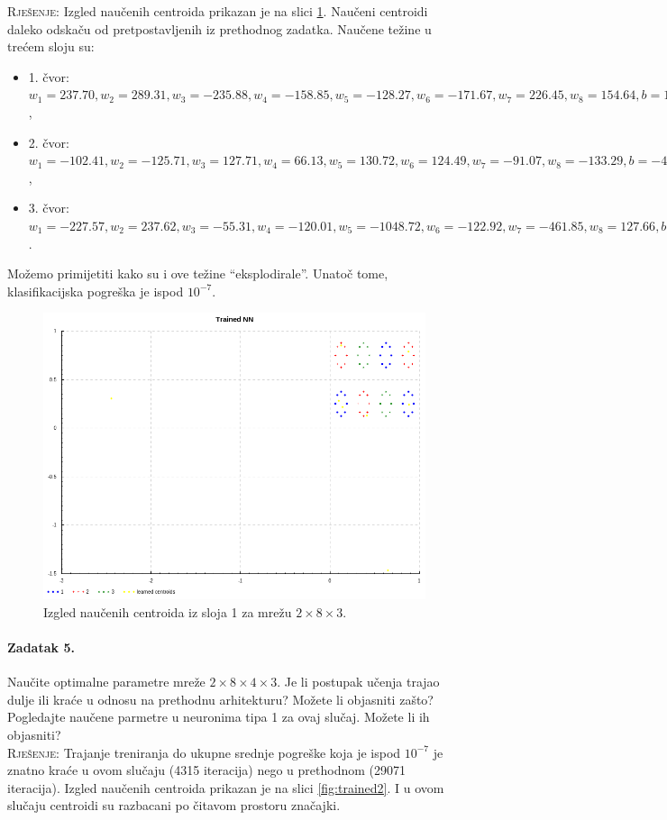 \documentclass[12pt, a4paper]{article}
\begin{document}
\noindent\textsc{Rješenje:}
Izgled naučenih centroida prikazan je na slici \ref{fig:trained}.
Naučeni centroidi daleko odskaču od pretpostavljenih iz prethodnog zadatka.
Naučene težine u trećem sloju su:
\begin{itemize}
  \item 1. čvor: $w_1=237.70, w_2=289.31, w_3=-235.88, w_4=-158.85, w_5=-128.27, w_6=-171.67, w_7=226.45, w_8=154.64, b=15.68$,
  \item 2. čvor: $w_1=-102.41, w_2=-125.71, w_3=127.71, w_4=66.13, w_5=130.72, w_6=124.49, w_7=-91.07, w_8=-133.29, b=-44.33$,
  \item 3. čvor: $w_1=-227.57, w_2=237.62, w_3=-55.31, w_4=-120.01, w_5=-1048.72, w_6=-122.92, w_7=-461.85, w_8=127.66, b=350.57$.
\end{itemize}
Možemo primijetiti kako su i ove težine ``eksplodirale''.
Unatoč tome, klasifikacijska pogreška je ispod $10^{-7}$.

\begin{figure}[p]
  \centering
  \includegraphics[width=0.8\linewidth]{trained.png}
  \caption{Izgled naučenih centroida iz sloja 1 za mrežu $2\times8\times3$.}
  \label{fig:trained}
\end{figure}

\paragraph{Zadatak 5.}
Naučite optimalne parametre mreže $2\times8\times4\times3$.
Je li postupak učenja trajao dulje ili kraće u odnosu na prethodnu arhitekturu?
Možete li objasniti zašto?
Pogledajte naučene parmetre u neuronima tipa 1 za ovaj slučaj.
Možete li ih objasniti?\\

\noindent\textsc{Rješenje:}
Trajanje treniranja do ukupne srednje pogreške koja je ispod $10^{-7}$ je znatno kraće u ovom slučaju (4315 iteracija) nego u prethodnom (29071 iteracija).
Izgled naučenih centroida prikazan je na slici \ref{fig:trained2}.
I u ovom slučaju centroidi su razbacani po čitavom prostoru značajki.
\end{document}

